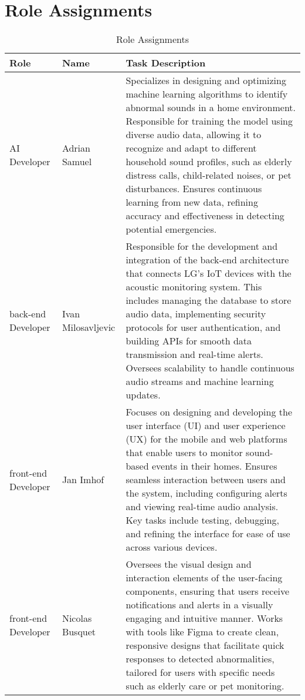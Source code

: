 \documentclass[conference]{IEEEtran}
\begin{document}
\section{Role Assignments}
\begin{table}[H]
    \centering
    \caption{Role Assignments}
    \begin{adjustbox}{max width=\textwidth}
        \begin{tabular}{|>{\centering\arraybackslash}m{1.2cm}|>{\centering\arraybackslash}m{1.6cm}|m{4.8cm}|}
        \hline
        \textbf{Role} & \textbf{Name} & \textbf{Task Description} \\
        \hline
        AI Developer & Adrian Samuel & Specializes in designing and optimizing machine learning algorithms to identify abnormal sounds in a home environment. Responsible for training the model using diverse audio data, allowing it to recognize and adapt to different household sound profiles, such as elderly distress calls, child-related noises, or pet disturbances. Ensures continuous learning from new data, refining accuracy and effectiveness in detecting potential emergencies. \\
        \hline
        back-end Developer & Ivan Milosavljevic & Responsible for the development and integration of the back-end architecture that connects LG’s IoT devices with the acoustic monitoring system. This includes managing the database to store audio data, implementing security protocols for user authentication, and building APIs for smooth data transmission and real-time alerts. Oversees scalability to handle continuous audio streams and machine learning updates. \\
        \hline
        front-end Developer & Jan Imhof & Focuses on designing and developing the user interface (UI) and user experience (UX) for the mobile and web platforms that enable users to monitor sound-based events in their homes. Ensures seamless interaction between users and the system, including configuring alerts and viewing real-time audio analysis. Key tasks include testing, debugging, and refining the interface for ease of use across various devices. \\
        \hline
        front-end Developer & Nicolas Busquet & Oversees the visual design and interaction elements of the user-facing components, ensuring that users receive notifications and alerts in a visually engaging and intuitive manner. Works with tools like Figma to create clean, responsive designs that facilitate quick responses to detected abnormalities, tailored for users with specific needs such as elderly care or pet monitoring. \\
        \hline
    \end{tabular}
    \end{adjustbox}
\end{table}
\end{document}
